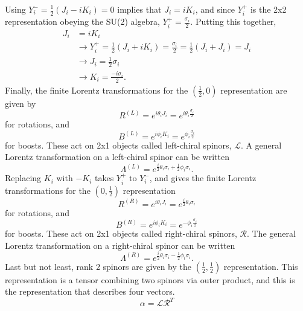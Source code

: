 \documentclass[12pt]{article}
\begin{document}
Using $Y_{i}^{-} = \frac{1}{2}(J_i - iK_i) = 0$ implies that $J_i = iK_i$, and since $Y_{i}^{+}$ is the 2x2 representation obeying the SU(2) algebra, $Y_{i}^{+} = \frac{\sigma_i}{2}$. Putting this together,
\begin{equation}
\begin{split}
J_i &= iK_i \\ 
&\rightarrow Y^+_i = \frac{1}{2}(J_i + iK_i) = \frac{\sigma_i}{2} = \frac{1}{2}(J_i + J_i) = J_i \\
&\rightarrow J_i = \frac{1}{2}\sigma_i \\
&\rightarrow K_i = \frac{-i\sigma_i}{2}.
\end{split}
\end{equation} 
Finally, the finite Lorentz transformations for the $(\frac{1}{2}, 0)$ representation are given by 
\begin{equation}
R^{(L)} = e^{i\theta_i J_i} = e^{i\theta_i \frac{\sigma_i}{2}}   
\end{equation}
for rotations, and
\begin{equation}
B^{(L)} = e^{i\phi_i K_i} = e^{\phi_i \frac{\sigma_i}{2}}   
\end{equation}
for boosts. These act on 2x1 objects called left-chiral spinors, $\mathcal{L}$. A general Lorentz transformation on a left-chiral spinor can be written
\begin{equation}
\Lambda^{(L)} = e^{\frac{i}{2}\theta_i \sigma_i + \frac{1}{2}\phi_i \sigma_i}.
\end{equation}
Replacing $K_i$ with $-K_i$ takes $Y^+_i$ to $Y^-_i$, and gives the finite Lorentz transformations for the $(0, \frac{1}{2})$ representation 
\begin{equation}
R^{(R)} = e^{i\theta_i J_i} = e^{\frac{i}{2}\theta_i \sigma_i}   
\end{equation}
for rotations, and
\begin{equation}
B^{(R)} = e^{i\phi_i K_i} = e^{-\phi_i \frac{\sigma_i}{2}}   
\end{equation}
for boosts. These act on 2x1 objects called right-chiral spinors, $\mathcal{R}$. The general Lorentz transformation on a right-chiral spinor can be written
\begin{equation}
\Lambda^{(R)} = e^{\frac{i}{2}\theta_i \sigma_i - \frac{1}{2}\phi_i \sigma_i}.
\end{equation}
Last but not least, rank 2 spinors are given by the $(\frac{1}{2}, \frac{1}{2})$ representation. This representation is a tensor combining two spinors via outer product, and this is the representation that describes four vectors.
\begin{equation}
\alpha = \mathcal{L} \mathcal{R}^{T}
\end{equation}
\end{document}
